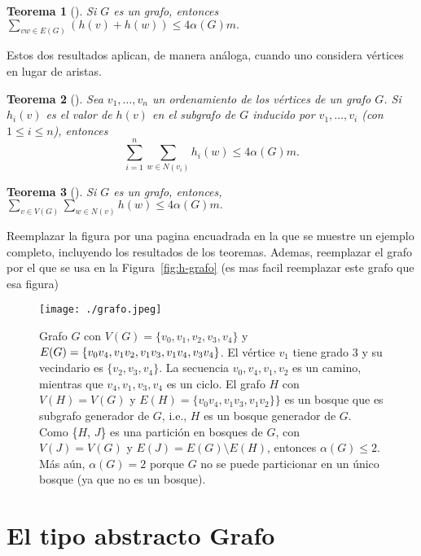 \documentclass[%
    a4paper,%
    fontsize=12pt,%
    DIV=12,
    twoside,%
    openright,%
    titlepage=true,%
    headsepline,%
    toc=bibliography,%
    parskip=half,%
    cleardoublepage=empty,%
    headings=big,%
]{scrbook}
\newtheorem{theorem}{Teorema}
\begin{document}
\begin{theorem}[\cite{LinSoulignacSzwarcfiterTCS2012}]
  Si $G$ es un grafo, entonces $\displaystyle \sum_{vw \in E(G)}(h(v)+h(w)) \leq 4\alpha(G)m.$
\end{theorem}

Estos dos resultados aplican, de manera análoga, cuando uno considera vértices en lugar de aristas.

\begin{theorem}[\cite{LinSoulignacSzwarcfiterTCS2012}]
 Sea $v_1, \ldots, v_n$ un ordenamiento de los vértices de un grafo $G$.  Si $h_i(v)$ es el valor de $h(v)$ en el subgrafo de $G$ inducido por $v_1, \ldots, v_i$ (con $1 \leq i \leq n$), entonces
  \[\displaystyle \sum_{i=1}^{n}\sum_{w \in N(v_i)}h_i(w) \leq 4\alpha(G)m.\]
\end{theorem}
%
\begin{theorem}[\cite{LinSoulignacSzwarcfiterTCS2012}]
  Si $G$ es un grafo, entonces, $\displaystyle \sum_{v \in V(G)}\sum_{w \in N(v)}h(w) \leq 4\alpha(G)m.$
\end{theorem}

{\huge Reemplazar la figura por una pagina encuadrada en la que se muestre un ejemplo completo, incluyendo los resultados de los teoremas.  Ademas, reemplazar el grafo por el que se usa en la Figura~\ref{fig:h-grafo} (es mas facil reemplazar este grafo que esa figura)}

\begin{figure}
  \centering
  \texttt{[image: ./grafo.jpeg]}

  \caption{Grafo $G$ con $V(G) = \{v_0,v_1,v_2,v_3,v_4\}$ y $E(G) =\{v_0v_4,\penalty0 v_1v_2,\penalty0 v_1v_3,\penalty0 v_1v_4,\penalty0 v_3v_4\}$.  El vértice $v_1$ tiene grado $3$ y su vecindario es $\{v_2,v_3,v_4\}$. La secuencia $v_0, v_4, v_1, v_2$ es un camino, mientras que $v_4,v_1,v_3,v_4$ es un ciclo.  El grafo $H$ con $V(H) = V(G)$ y $E(H) = \{v_0v_4, v_1v_3, v_1v_2\}\}$ es un bosque que es subgrafo generador de $G$, i.e., $H$ es un bosque generador de $G$.  Como \{$H$, $J$\} es una partición en bosques de $G$, con $V(J) = V(G)$ y $E(J) = E(G) \setminus E(H)$, entonces $\alpha(G) \leq 2$.  Más aún, $\alpha(G) = 2$ porque $G$ no se puede particionar en un único bosque (ya que no es un bosque).}\label{fig:definiciones}
\end{figure}


\chapter{El tipo abstracto Grafo}
\label{sec:tad grafo}
\end{document}
